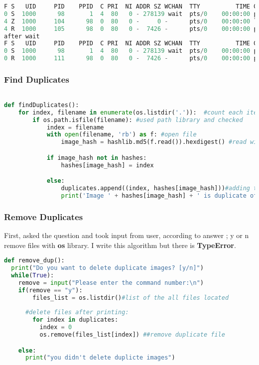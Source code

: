 \documentclass[onecolumn]{article}
\begin{document}
\begin{lstlisting}[language=Python, caption= Example Output of Clearing Orphans ]
F S   UID     PID    PPID  C PRI  NI ADDR SZ WCHAN  TTY          TIME CMD
0 S  1000      98       1  4  80   0 - 278139 wait  pts/0    00:00:00 prybar-python3
4 Z  1000     104      98  0  80   0 -     0 -      pts/0    00:00:00 ls <defunct>
4 R  1000     105      98  0  80   0 -  7426 -      pts/0    00:00:00 ps
after wait
F S   UID     PID    PPID  C PRI  NI ADDR SZ WCHAN  TTY          TIME CMD
0 S  1000      98       1  4  80   0 - 278139 wait  pts/0    00:00:00 prybar-python3
0 R  1000     111      98  0  80   0 -  7426 -      pts/0    00:00:00 ps
\end{lstlisting}



\subsubsection{Find Duplicates }


\begin{lstlisting}[language=Python, caption= Find Duplicate ]

def findDuplicates():  
    for index, filename in enumerate(os.listdir('.')):  #count each iteration
        if os.path.isfile(filename): #used path library and checked
            index = filename
            with open(filename, 'rb') as f: #open file 
                image_hash = hashlib.md5(f.read()).hexdigest() #read with haslib

            if image_hash not in hashes: 
                hashes[image_hash] = index

            else:
                duplicates.append((index, hashes[image_hash]))#adding the duplicate list 
                print('Image ' + hashes[image_hash] + ' is duplicate of Image ' + index)

\end{lstlisting}

\subsubsection{Remove Duplicates  }

First, asked the question and took input from user, according to answer ; y or n remove files with \textbf{os}  library. I write this algorithm but there is \textbf{TypeError}. 

\begin{lstlisting}[language=Python, caption= Remove Duplicates ]
def remove_dup():
  print("Do you want to delete duplicate images? [y/n]")             
  while(True):
    remove = input("Please enter the command number:\n")  
    if(remove == "y"): 
        files_list = os.listdir()#list of the all files located
        
      #delete files after printing:
        for index in duplicates:
          index = 0
          os.remove(files_list[index]) ##remove duplicate file

    else:
      print("you didn't delete duplicte images")
\end{lstlisting}
\end{document}
